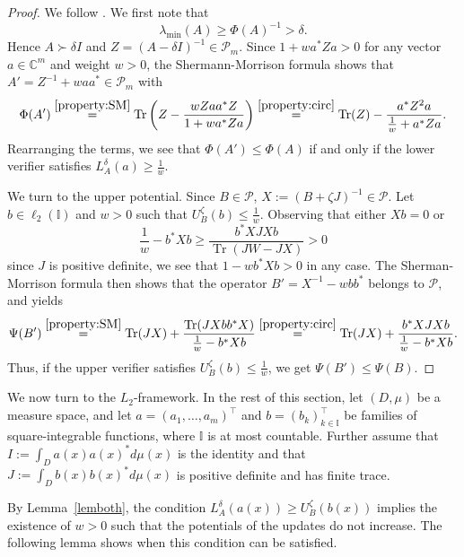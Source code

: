 \documentclass[a4paper,11pt]{article}
\renewcommand{\(}{\left (}
\renewcommand{\)}{\right )}
\newcommand{\<}{\langle}
\renewcommand{\>}{\rangle}
\newcommand{\C}{\mathbb{C}}
\theoremstyle{definition}
\DeclareMathOperator{\Tr}{Tr}
\begin{document}
\begin{proof}
We follow \cite[Lemmas 3.3--3.4]{BSS}. 
We first note that
\[
\lambda_{\min}(A) \geq \Phi(A)^{-1} 
> \delta. 
\]
Hence $A\succ \delta I$ and $Z=(A-\delta I)^{-1}\in \mathcal P_m$.
Since $1+wa^*Za >0$ for any vector $a\in \C^m$ and weight $w>0$,
the Shermann-Morrison formula shows that $A'=Z^{-1}+waa^*\in \mathcal P_m$ with
\begin{equation}
\label{eq:lower-barrier-cond}
\Phi(A')
\overset{\eqref{property:SM}}{=}
\Tr\left(Z-\frac{wZaa^*Z}{1+w a^*Za}\right)\overset{\eqref{property:circ}}{=} \Tr(Z)-\frac{a^*Z^2a}{\frac{1}{w}+a^*Za}.
\end{equation}
Rearranging the terms, we see that $\Phi(A')\leq \Phi(A)$
if and only if the lower verifier satisfies $L_A^\delta(a) \geq \frac{1}{w}$.
 
We turn to the upper potential.
Since $B\in \mathcal P$, $X:=(B+\zeta J)^{-1}\in \mathcal P$.
Let $b\in \ell_2(\mathbb I)$ and $w>0$ such that $U_B^\zeta(b)\leq \frac{1}{w}$. Observing that either $Xb=0$ or
\[
\frac{1}{w}-b^*Xb\geq \frac{b^*X J Xb}{\Tr(JW-JX)}>0
\]
since $J$ is positive definite, we see that $1-wb^*Xb>0$ in any case.
The Sherman-Morrison formula then shows that the operator
$B'=X^{-1}-wbb^*$ belongs to $\mathcal P$, and yields
\[
 \Psi(B')
\overset{\eqref{property:SM}}{=}
\Tr(JX)+\frac{\Tr(JXbb^*X)}{\frac{1}{w}-b^*Xb}
\overset{\eqref{property:circ}}{=} \Tr(JX)+\frac{b^*XJXb}{\frac{1}{w}-b^*Xb}.
\]
Thus, if the upper verifier
satisfies $U_B^\zeta(b)\leq \frac{1}{w}$, we get $\Psi(B')\leq \Psi(B)$.
\end{proof}


We now turn to the $L_2$-framework.
In the rest of this section,
let $(D,\mu)$ be a measure space, and let $a=(a_1,\hdots,a_m)^\top$
and $b= (b_k)_{k\in \mathbb I}^\top$ be families of square-integrable functions,
where $\mathbb I$ is at most countable.
Further assume that 
$I:=\int_D a(x)a(x)^*d\mu(x)$ is the identity 
and that $J:=\int_D b(x)b(x)^*d\mu(x)$ is positive definite and has finite trace.

By Lemma~\ref{lemboth},
the condition $L_A^\delta(a(x)) \ge U_B^\zeta(b(x))$
implies the existence of $w>0$
such that the potentials of the updates
do not increase.
The following lemma shows when this condition can be satisfied.
\end{document}
